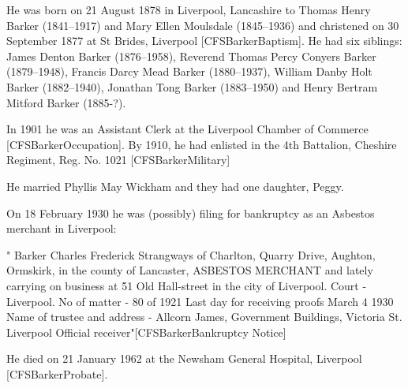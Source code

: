 
He was born on 21 August 1878 in	Liverpool, Lancashire to Thomas Henry Barker (1841--1917) and Mary Ellen Moulsdale (1845--1936) and christened on 30 September 1877 at St Brides, Liverpool [CFSBarkerBaptism]. He had six siblings:  James Denton Barker (1876--1958), Reverend Thomas Percy Conyers Barker (1879--1948), Francis Darcy Mead Barker (1880--1937), William Danby Holt Barker (1882--1940), Jonathan Tong Barker (1883--1950) and Henry Bertram Mitford Barker (1885-?). 


In 1901 he was an Assistant Clerk at the Liverpool  Chamber of Commerce [CFSBarkerOccupation].  By 1910, he had enlisted in the  4th Battalion, Cheshire Regiment, Reg. No. 1021 [CFSBarkerMilitary]

He married Phyllis May Wickham and they had one daughter, Peggy.


On 18 February 1930 he was (possibly) filing for bankruptcy as an Asbestos merchant in Liverpool:

" Barker Charles Frederick Strangways of Charlton, Quarry Drive, Aughton, Ormskirk, in the county of Lancaster, ASBESTOS MERCHANT and lately carrying on business at 51 Old Hall-street in the city of Liverpool.
Court - Liverpool.
No of matter - 80 of 1921
Last day for receiving proofs March 4 1930
Name of trustee and address - Allcorn James, Government Buildings, Victoria St. Liverpool Official receiver"[CFSBarkerBankruptcy Notice]


He died on 21 January 1962 at the Newsham General Hospital, Liverpool [CFSBarkerProbate].
